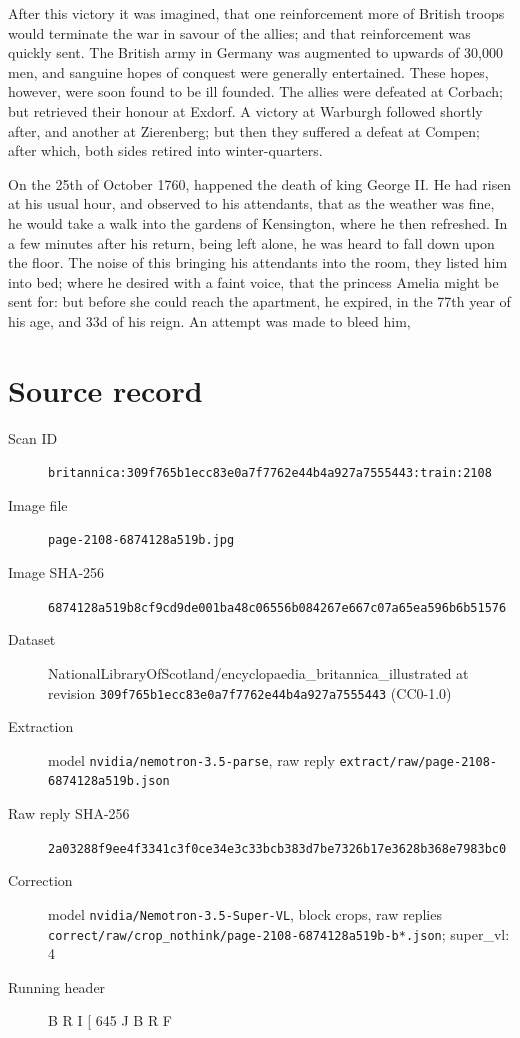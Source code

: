 \documentclass{article}
\begin{document}
After this victory it was imagined, that one reinforcement more of British troops would terminate the war in savour of the allies; and that reinforcement was quickly sent. The British army in Germany was augmented to upwards of 30,000 men, and sanguine hopes of conquest were generally entertained. These hopes, however, were soon found to be ill founded. The allies were defeated at Corbach; but retrieved their honour at Exdorf. A victory at Warburgh followed shortly after, and another at Zierenberg; but then they suffered a defeat at Compen; after which, both sides retired into winter-quarters.

On the 25th of October 1760, happened the death of king George II. He had risen at his usual hour, and observed to his attendants, that as the weather was fine, he would take a walk into the gardens of Kensington, where he then refreshed. In a few minutes after his return, being left alone, he was heard to fall down upon the floor. The noise of this bringing his attendants into the room, they listed him into bed; where he desired with a faint voice, that the princess Amelia might be sent for: but before she could reach the apartment, he expired, in the 77th year of his age, and 33d of his reign. An attempt was made to bleed him,


\section*{Source record}
\begin{description}
\item[Scan ID] \texttt{britannica:309f765b1ecc83e0a7f7762e44b4a927a7555443:train:2108}
\item[Image file] \texttt{page-2108-6874128a519b.jpg}
\item[Image SHA-256] \texttt{6874128a519b8cf9cd9de001ba48c06556b084267e667c07a65ea596b6b51576}
\item[Dataset] NationalLibraryOfScotland/encyclopaedia\_britannica\_illustrated at revision \texttt{309f765b1ecc83e0a7f7762e44b4a927a7555443} (CC0-1.0)
\item[Extraction] model \texttt{nvidia/nemotron-3.5-parse}, raw reply \texttt{extract/raw/page-2108-6874128a519b.json}
\item[Raw reply SHA-256] \texttt{2a03288f9ee4f3341c3f0ce34e3c33bcb383d7be7326b17e3628b368e7983bc0}
\item[Correction] model \texttt{nvidia/Nemotron-3.5-Super-VL}, block crops, raw replies \texttt{correct/raw/crop\_nothink/page-2108-6874128a519b-b*.json}; super\_vl: 4
\item[Running header] B R I  [ 645 J B R F
\end{description}
\end{document}
